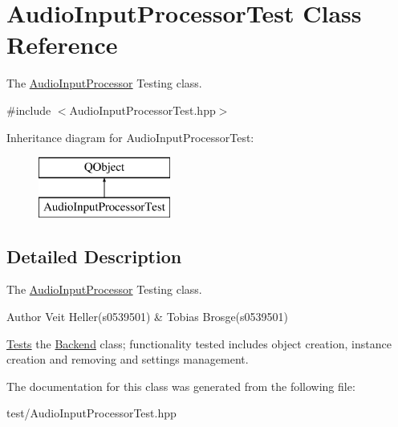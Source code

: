 \hypertarget{classAudioInputProcessorTest}{\section{Audio\+Input\+Processor\+Test Class Reference}
\label{classAudioInputProcessorTest}
}


The \hyperlink{classAudioInputProcessor}{Audio\+Input\+Processor} Testing class.  




{\ttfamily \#include $<$Audio\+Input\+Processor\+Test.\+hpp$>$}

Inheritance diagram for Audio\+Input\+Processor\+Test\+:\begin{figure}[H]
\begin{center}
\leavevmode
\includegraphics[height=2.000000cm]{classAudioInputProcessorTest}
\end{center}
\end{figure}


\subsection{Detailed Description}
The \hyperlink{classAudioInputProcessor}{Audio\+Input\+Processor} Testing class. 

\begin{DoxyAuthor}{Author}
Veit Heller(s0539501) \& Tobias Brosge(s0539501)
\end{DoxyAuthor}
\hyperlink{structTests}{Tests} the \hyperlink{classBackend}{Backend} class; functionality tested includes object creation, instance creation and removing and settings management. 

The documentation for this class was generated from the following file\+:\begin{DoxyCompactItemize}
\item 
test/Audio\+Input\+Processor\+Test.\+hpp\end{DoxyCompactItemize}
